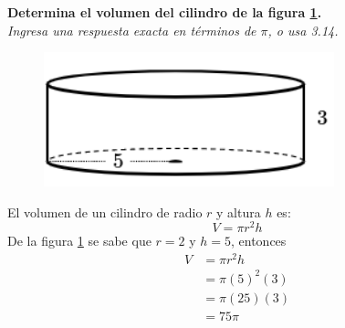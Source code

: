 \question[10] \textbf{Determina el volumen del cilindro de la figura \ref{fig:vol_cil_11}.}\\
\textit{Ingresa una respuesta exacta en términos de $\pi$, o usa 3.14.}

\begin{minipage}{0.3\linewidth}
    \begin{figure}[H]
        \begin{center}
            \includegraphics[width=0.75\textwidth]{../images/vol_cil_11.png}
        \end{center}
        \caption{}
        \label{fig:vol_cil_11}
    \end{figure}
\end{minipage}
\begin{minipage}{0.7\linewidth}
    \begin{solutionbox}{6cm}        El volumen de un cilindro de radio $r$ y altura $h$ es:
        \begin{equation*}
            V = \pi r^2 h
        \end{equation*}
        De la figura \ref{fig:vol_cil_11} se sabe que $r=2$ y $h=5$, entonces
        \begin{equation*}
            \begin{split}
                V & = \pi r^2 h\\
                & = \pi (5)^2 (3)\\
                & = \pi (25) (3)\\
                & = 75\pi
            \end{split}
        \end{equation*}
    \end{solutionbox}
\end{minipage}